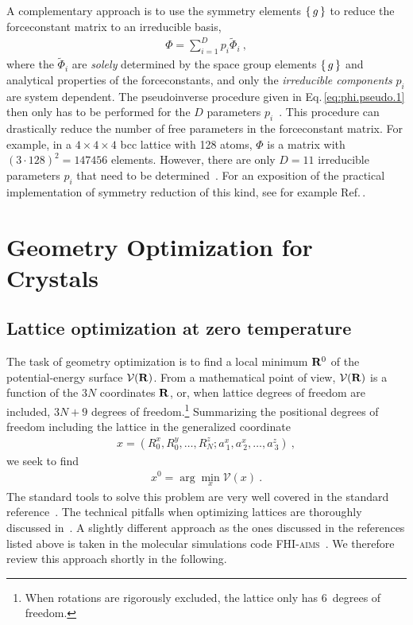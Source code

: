 A complementary approach is to use the symmetry elements $\set{g}$ to reduce the forceconstant matrix to an irreducible basis,
\begin{align}
\Phi 
= \sum_{i=1}^{D} p_i \tilde{\Phi}_i~,
\label{eq:sym.Phi.irrep.1}
\end{align}
where the $\tilde{\Phi}_i$ are \emph{solely} determined by the space group elements $\set{g}$ and analytical properties of the forceconstants, and only the \emph{irreducible components} $p_i$ are system dependent. The pseudoinverse procedure given in Eq.\,\eqref{eq:phi.pseudo.1} then only has to be performed for the $D$ parameters $p_i$~\cite{Parlinski.1997}. This procedure can drastically reduce the number of free parameters in the forceconstant matrix. For example, in a $4\times4\times4$ bcc lattice with 128 atoms, $\Phi$ is a matrix with $(3 \cdot 128)^2 = 147456$ elements. However, there are only $D=11$ irreducible parameters $p_i$ that need to be determined~\cite{Hellman.2013}. For an exposition of the practical implementation of symmetry reduction of this kind, see for example Ref.\,\cite[p.\,25\,ff]{ErikssonThesis}.


\chapter{Geometry Optimization for Crystals}
\section{Lattice optimization at zero temperature}
\label{sec:ltrm}
The task of geometry optimization is to find a local minimum ${\bf R}^0$ of the potential-energy surface $\mathcal{V} ({\bf R})$. From a mathematical point of view, $\mathcal V ({\bf R})$ is a function of the $3N$ coordinates ${\bf R}$, or, when lattice degrees of freedom are included, $3N + 9$ degrees of freedom.\footnote{When rotations are rigorously excluded, the lattice only has 6~degrees of freedom.} Summarizing the positional degrees of freedom including the lattice in the generalized coordinate
\begin{align}
x 
= \left( R_{0}^x, R_{0}^y, \ldots, R_{N}^z; a^x_{~1}, a^x_{~2}, \ldots, a^z_{~3} \right) ~,
\label{eq:opt.x}
\end{align}
we seek to find
\begin{align}
x^0 = \arg \min_x \mathcal V (x)~.
\end{align}
The standard tools to solve this problem are very well covered in the standard reference~\cite{nocedal2006}. The technical pitfalls when optimizing lattices are thoroughly discussed in~\cite{Pfrommer.1997,Tadmor.1999}.
A slightly different approach as the ones discussed in the references listed above is taken in the molecular simulations code \textsc{FHI-aims}~\cite{FHI-aims}. We therefore review this approach shortly in the following.

